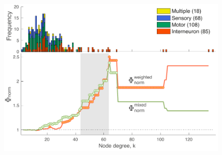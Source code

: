 \documentclass[10pt,letterpaper]{article}
\begin{document}
{%
\begin{figure}[h]
\centering
    \includegraphics[width=1\textwidth]{weightedRCALL.pdf}

\end{figure}}
\end{document}
